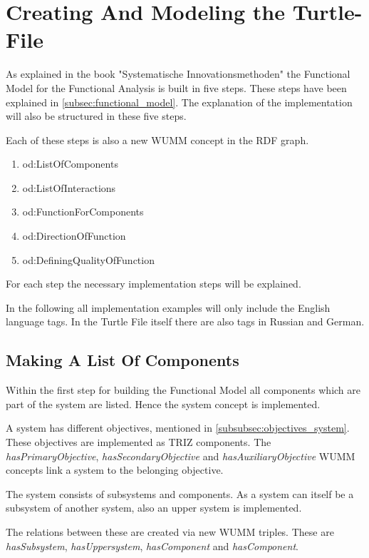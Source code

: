 \documentclass[11pt,a4paper]{article}
\begin{document}
\section{Creating And Modeling the Turtle-File}
\label{sec:turtle_file}

As explained in the book "Systematische Innovationsmethoden" the Functional
Model for the Functional Analysis is built in five steps.  These steps have
been explained in \ref{subsec:functional_model}.  The explanation of the
implementation will also be structured in these five steps.

Each of these steps is also a new WUMM concept in the RDF graph. 

\begin{enumerate}
\item od:ListOfComponents
\item od:ListOfInteractions
\item od:FunctionForComponents
\item od:DirectionOfFunction
\item od:DefiningQualityOfFunction
\end{enumerate}

For each step the necessary implementation steps will be explained.

In the following all implementation examples will only include the English
language tags.  In the Turtle File itself there are also tags in Russian and
German.


\subsection{Making A List Of Components}

Within the first step for building the Functional Model all components which
are part of the system are listed.  Hence the system concept is implemented.

A system has different objectives, mentioned in
\ref{subsubsec:objectives_system}.  These objectives are implemented as TRIZ
components.  The \textit{hasPrimaryObjective}, \textit{hasSecondaryObjective}
and \textit{hasAuxiliaryObjective} WUMM concepts link a system to the
belonging objective.

The system consists of subsystems and components.  As a system can itself be a
subsystem of another system, also an upper system is implemented.

The relations between these are created via new WUMM triples.  These are
\textit{hasSubsystem}, \textit{hasUppersystem}, \textit{hasComponent} and
\textit{hasComponent}.
\end{document}
